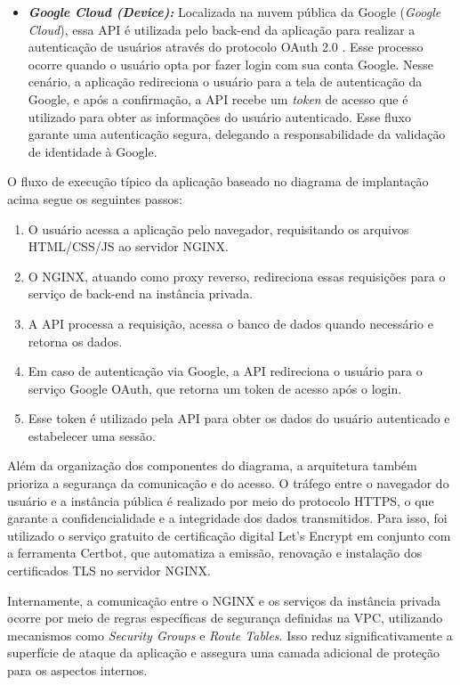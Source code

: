 \begin{itemize}
  \item \textbf{\textit{Google Cloud (Device):}} Localizada na nuvem pública da Google (\textit{Google Cloud}), essa API é utilizada pelo back-end da aplicação para realizar a autenticação de usuários através do protocolo OAuth 2.0 \cite{GoogleOAuth}. Esse processo ocorre quando o usuário opta por fazer login com sua conta Google. Nesse cenário, a aplicação redireciona o usuário para a tela de autenticação da Google, e após a confirmação, a API recebe um \textit{token} de acesso que é utilizado para obter as informações do usuário autenticado. Esse fluxo garante uma autenticação segura, delegando a responsabilidade da validação de identidade à Google.
\end{itemize}

O fluxo de execução típico da aplicação baseado no diagrama de implantação acima segue os seguintes passos:
\begin{enumerate}
  \item O usuário acessa a aplicação pelo navegador, requisitando os arquivos HTML/CSS/JS ao servidor NGINX.
  \item O NGINX, atuando como proxy reverso, redireciona essas requisições para o serviço de back-end na instância privada.
  \item A API processa a requisição, acessa o banco de dados quando necessário e retorna os dados.
  \item Em caso de autenticação via Google, a API redireciona o usuário para o serviço Google OAuth, que retorna um token de acesso após o login.
  \item Esse token é utilizado pela API para obter os dados do usuário autenticado e estabelecer uma sessão.
\end{enumerate}

Além da organização dos componentes do diagrama, a arquitetura também prioriza a segurança da comunicação e do acesso. O tráfego entre o navegador do usuário e a instância pública é realizado por meio do protocolo HTTPS, o que garante a confidencialidade e a integridade dos dados transmitidos. Para isso, foi utilizado o serviço gratuito de certificação digital Let's Encrypt em conjunto com a ferramenta Certbot, que automatiza a emissão, renovação e instalação dos certificados TLS no servidor NGINX.

Internamente, a comunicação entre o NGINX e os serviços da instância privada ocorre por meio de regras específicas de segurança definidas na VPC, utilizando mecanismos como \textit{Security Groups} e \textit{Route Tables}. Isso reduz significativamente a superfície de ataque da aplicação e assegura uma camada adicional de proteção para os aspectos internos.


